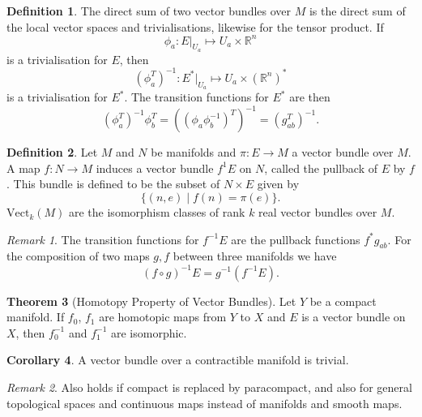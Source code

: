 \documentclass[twocolumn]{article}
\theoremstyle{definition}
\newtheorem{definition}{Definition}[section]
\newtheorem{theorem}[definition]{Theorem}
\newtheorem{corollary}[definition]{Corollary}
\theoremstyle{remark}
\newtheorem*{remark}{Remark}
\begin{document}
\begin{definition}
    The direct sum of two vector bundles over $M$ is the direct sum of the local vector spaces and trivialisations,
    likewise for the tensor product. If
    \begin{equation}
        \phi_a : E|_{U_a} \mapsto U_a \times \mathbb{R}^n
    \end{equation}
    is a trivialisation for $E$, then
    \begin{equation}
        (\phi_a^T)^{-1} : E^*|_{U_a} \mapsto U_a \times \left(\mathbb{R}^n\right)^*
    \end{equation}
    is a trivialisation for $E^*$. The transition functions for $E^*$ are then
    \begin{equation}
        (\phi_a^T)^{-1} \phi_b^T = ((\phi_a \phi_b^{-1})^T)^{-1} = (g^T_{ab})^{-1}.
    \end{equation}
\end{definition}
\begin{definition}
    Let $M$ and $N$ be manifolds and $\pi: E \rightarrow M$ a vector bundle over $M$.
    A map $f: N \rightarrow M$ induces a vector bundle $f^{1}E$ on $N$, called the pullback of $E$ by $f$.
    This bundle is defined to be the subset of $N \times E$ given by
    \begin{equation}
        \{ (n, e) \mid  f(n) = \pi(e) \}.
    \end{equation}
    $\text{Vect}_k(M)$ are the isomorphism classes of rank $k$ real vector bundles over $M$.
\end{definition}
\begin{remark}
    The transition functions for $f^{-1}E$ are the pullback functions $f^*g_{ab}$.
    For the composition of two maps $g, f$ between three manifolds we have
    \begin{equation}
        (f \circ g)^{-1} E = g^{-1}(f^{-1}E).
    \end{equation}
\end{remark}
\begin{theorem}[Homotopy Property of Vector Bundles]
    Let $Y$ be a compact manifold. If $f_0$, $f_1$ are homotopic maps from $Y$ to $X$ and $E$ is a vector bundle on $X$,
    then $f_0^{-1}$ and $f_1^{-1}$ are isomorphic.
\end{theorem}
\begin{corollary}
    A vector bundle over a contractible manifold is trivial.
\end{corollary}
\begin{remark}
    Also holds if compact is replaced by paracompact, and also for general topological spaces and continuous maps instead of manifolds and smooth maps.
\end{remark}
\end{document}
